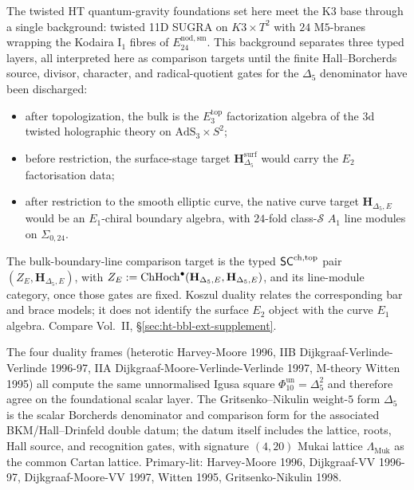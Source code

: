 \begin{remark}
\label{rem:vol2fnd-deep-1}
The twisted HT quantum-gravity foundations set here meet the K3 base
through a single background: twisted 11D SUGRA on $K3\times T^2$
with $24$ M$5$-branes wrapping the Kodaira I$_1$ fibres of
$E^{\mathrm{nod,sm}}_{24}$. This background separates three typed
layers, all interpreted here as comparison targets until the finite
Hall--Borcherds source, divisor, character, and radical-quotient gates
for the $\Delta_5$ denominator have been discharged:
\begin{itemize}
\item after topologization, the bulk is the $E_3^{\mathrm{top}}$
 factorization algebra of the $3$d twisted holographic theory on
 $\mathrm{AdS}_3\times S^2$;
\item before restriction, the surface-stage target
 $\mathbf H_{\Delta_5}^{\mathrm{surf}}$ would carry the $E_2$
 factorisation data;
\item after restriction to the smooth elliptic curve, the native curve
 target $\mathbf H_{\Delta_5,E}$ would be an $E_1$-chiral boundary
 algebra, with $24$-fold class-$\mathcal S$ $A_1$ line modules on
 $\Sigma_{0,24}$.
\end{itemize}
The bulk-boundary-line comparison target is the typed $\mathsf{SC}^{\mathrm{ch},\mathrm{top}}$ pair
$(Z_E,\mathbf H_{\Delta_5,E})$, with
$Z_E:=\mathrm{Ch}\mathrm{Hoch}^\bullet(\mathbf H_{\Delta_5,E},\mathbf H_{\Delta_5,E})$,
and its line-module category, once those gates are fixed. Koszul
duality relates the corresponding bar and brace models; it does not
identify the surface $E_2$ object with the curve $E_1$ algebra.
Compare Vol.~II, \S\ref{sec:ht-bbl-ext-supplement}.
\end{remark}

\begin{remark}
\label{rem:vol2fnd-deep-2}
The four duality frames (heterotic Harvey-Moore 1996, IIB Dijkgraaf-Verlinde-Verlinde
1996-97, IIA Dijkgraaf-Moore-Verlinde-Verlinde 1997, M-theory Witten
1995) all compute the same unnormalised Igusa square
$\Phi_{10}^{\mathrm{un}}=\Delta_5^2$ and therefore agree on the
foundational scalar layer. The Gritsenko--Nikulin weight-$5$ form
$\Delta_5$ is the scalar Borcherds denominator and comparison form for
the associated BKM/Hall--Drinfeld double datum; the datum itself
includes the lattice, roots, Hall source, and recognition gates, with
signature $(4,20)$ Mukai lattice $\Lambda_{\mathrm{Muk}}$ as the common
Cartan lattice. Primary-lit: Harvey-Moore 1996, Dijkgraaf-VV
1996-97, Dijkgraaf-Moore-VV 1997, Witten 1995, Gritsenko-Nikulin 1998.
\end{remark}
